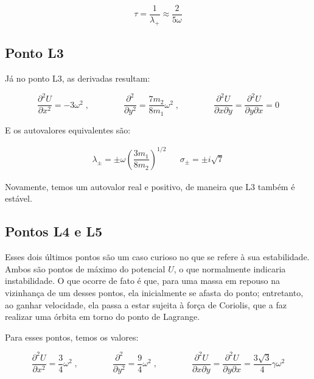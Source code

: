 \begin{equation}
\tau = \frac{1}{\lambda_+} \approx \frac{2}{5\omega}
\end{equation}

\subsection{Ponto L3}

Já no ponto L3, as derivadas resultam:

\begin{equation}
\dfrac{\partial ^2U}{\partial x^2} = -3\omega^2 \;, \qquad \qquad \dfrac{\partial ^2}{\partial y^2} = \frac{7m_2}{8m_1}\omega^2 \;, \qquad \qquad \dfrac{\partial ^2U}{\partial x\partial y} = \dfrac{\partial ^2U}{\partial y\partial x} = 0
\end{equation}

E os autovalores equivalentes são:

\begin{align}
\lambda_{\pm} = \pm \omega \left(\dfrac{3m_1}{8m_2}\right)^{1/2} && \sigma_{\pm} = \pm i\sqrt{7}
\end{align}

Novamente, temos um autovalor real e positivo, de maneira que L3 também é estável.

\subsection{Pontos L4 e L5}

Esses dois últimos pontos são um caso curioso no que se refere à sua estabilidade. Ambos são pontos de máximo do potencial $U$, o que normalmente indicaria instabilidade. O que ocorre de fato é que, para uma massa em repouso na vizinhança de um desses pontos, ela inicialmente se afasta do ponto; entretanto, ao ganhar velocidade, ela passa a estar sujeita à força de Coriolis, que a faz realizar uma órbita em torno do ponto de Lagrange.

Para esses pontos, temos os valores:

\begin{equation}
\dfrac{\partial ^2U}{\partial x^2} = \dfrac{3}{4}\omega^2 \;, \qquad \qquad \dfrac{\partial ^2}{\partial y^2} = \dfrac{9}{4}\omega^2 \;, \qquad \qquad \dfrac{\partial ^2U}{\partial x\partial y} = \dfrac{\partial ^2U}{\partial y\partial x} = \dfrac{3\sqrt{3}}{4}\gamma \omega^2
\end{equation}

\vspace{20px}

